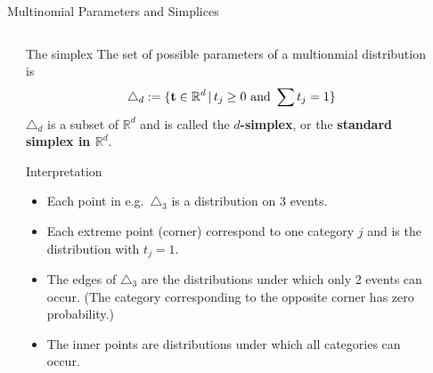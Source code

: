 \documentclass[dvipsnames,mathserif]{beamer}
\def\simp{\Delta}
\begin{document}
{\def\simp{\triangle}
\begin{frame}{Multinomial Parameters and Simplices}
  \begin{columns}
    \begin{column}{0\textwidth}
    \end{column}
    \begin{column}{0.7\textwidth}
\vspace{-3mm}
      \begin{block}{The simplex}
      The set of possible parameters of a multionmial distribution is
\vspace{-2mm}
{\scriptsize
      \begin{equation*}
        \simp_d:=\lbrace \t \in \mathbb{R}^d \,|\,
        t_j\geq 0 \text{ and }\sum t_j =1 \rbrace
      \end{equation*}
}
      $\simp_d$ is a subset of $\mathbb{R}^d$ and is called the
      \textbf{$d$-simplex}, or the \textbf{standard simplex in
        $\mathbb{R}^d$}.
      \end{block}
\vspace{-2mm}
      \begin{block}{Interpretation}
\vspace{-3mm}
        \begin{itemize}
      \item Each point in e.g.\ $\simp_3$ is a distribution on 3
        events.
\vspace{-2mm}
      \item Each extreme point (corner) correspond to one category $j$
        and is the distribution with $t_j=1$.
\vspace{-2mm}
      \item The edges of $\simp_3$ are the distributions under which
        only 2 events can occur. (The category corresponding to the
        opposite corner has zero probability.)
\vspace{-2mm}
      \item The inner points are distributions under which all
        categories can occur.
        \end{itemize}
      \end{block}
    \end{column}
    \begin{column}{0.4\textwidth}
      \begin{center}
        
      \end{center}
    \end{column}
  \end{columns}
\end{frame}

}
\end{document}
